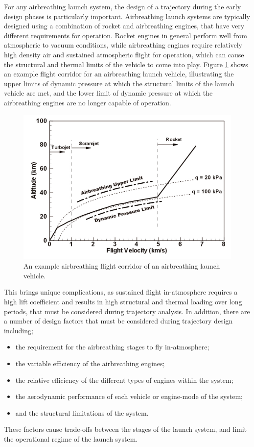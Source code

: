 
For any airbreathing launch system, the design of a trajectory during the early design phases is particularly important. Airbreathing launch systems are typically designed using a combination of rocket and airbreathing engines, that have very different requirements for operation. Rocket engines in general perform well from atmospheric to vacuum conditions, while airbreathing engines require relatively high density air and sustained atmospheric flight for operation, which can cause the structural and thermal limits of the vehicle to come into play\cite{Preller2017b}. Figure \ref{fig:FlightCorridor} shows an example flight corridor for an airbreathing launch vehicle, illustrating the upper limits of dynamic pressure at which the structural limits of the launch vehicle are met, and the lower limit of dynamic pressure at which the airbreathing engines are no longer capable of operation. 
\begin{figure}[ht]
	\centering
	\includegraphics[width=0.7\linewidth]{figures/2_literature-review/FlightCorridor}
	\caption{An example airbreathing flight corridor of an airbreathing launch vehicle\cite{Smart2007a}.}
	\label{fig:FlightCorridor}
\end{figure}
This brings unique complications, as sustained flight in-atmosphere requires a high lift coefficient and results in high structural and thermal loading over long periods, that must be considered during trajectory analysis. In addition, there are a number of design factors that must be considered during trajectory design including;
\begin{itemize}
	\item the requirement for the airbreathing stages to fly in-atmosphere;
	\item the variable efficiency of the airbreathing engines;
	\item the relative efficiency of the different types of engines within the system;
	\item the aerodynamic performance of each vehicle or engine-mode of the system;
	\item and the structural limitations of the system.
\end{itemize}
These factors cause trade-offs between the stages of the launch system\cite{Staufenbiel2000}, and limit the operational regime of the launch system.


